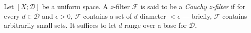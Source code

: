 Let $[X; \mathcal{D}]$ be a uniform space. A $z$-filter $\mathcal{F}$ is said to be a \textit{Cauchy $z$-filter} if for every $d \in \mathcal{D}$ and $\epsilon > 0$, $\mathcal{F}$ contains a set of $d$-diameter $< \epsilon$ — briefly, $\mathcal{F}$ contains arbitrarily small sets. It suffices to let $d$ range over a base for $\mathcal{D}$.

